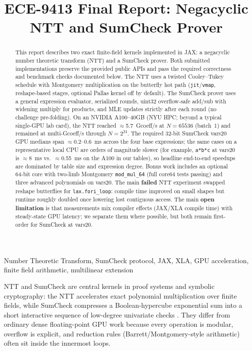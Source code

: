 \documentclass[conference]{IEEEtran}
\title{ECE-9413 Final Report: Negacyclic NTT and SumCheck Prover}
\author{\IEEEauthorblockN{Koshiq Hossain (kh3134)\qquad Jack Chou (cc9171)}
\IEEEauthorblockA{New York University\\
ECE-9413}}
\begin{document}
\maketitle

\begin{abstract}
This report describes two exact finite-field kernels implemented in JAX: a
negacyclic number theoretic transform (NTT) and a SumCheck prover. Both
submitted implementations preserve the provided public APIs and pass the
required correctness and benchmark checks documented below. The NTT uses a
twisted Cooley--Tukey schedule with Montgomery multiplication on the butterfly
hot path (\texttt{jit}/\texttt{vmap}, reshape-based stages, optional Pallas
kernel off by default). The SumCheck prover uses a general expression
evaluator, serialized rounds, uint32 overflow-safe add/sub with widening
multiply for products, and MLE updates strictly after each round (no
challenge pre-folding). On an NVIDIA A100--40GB (NYU HPC; beyond a typical
single-GPU lab card), the NTT reached $\approx$5.7~Gcoeff/s at $N{=}65536$
(batch~1) and remained at multi-Gcoeff/s through $N{=}2^{24}$. The required
32-bit SumCheck vars20 GPU medians span $\approx$0.2--0.6~ms across the four
base expressions; the same cases on a representative local CPU are orders of
magnitude slower (for example, \texttt{a*b*c} at vars20 is $\approx$8~ms vs.\
$\approx$0.55~ms on the A100 in our tables), so headline end-to-end speedups
are dominated by table size and expression degree. Bonus work includes an
optional 64-bit core with two-limb Montgomery \texttt{mod\_mul\_64} (full
core64 tests passing) and three advanced polynomials on vars20. The main
\textbf{failed} NTT experiment swapped reshape butterflies for
\texttt{lax.fori\_loop}: compile time improved on small shapes but runtime
roughly doubled once lowering lost contiguous access. The main \textbf{open
limitation} is that measurements mix compiler effects (JAX/XLA compile time)
with steady-state GPU latency; we separate them where possible, but both remain
first-order for SumCheck at vars20.
\end{abstract}

\begin{IEEEkeywords}
Number Theoretic Transform, SumCheck protocol, JAX, XLA, GPU acceleration,
finite field arithmetic, multilinear extension
\end{IEEEkeywords}
NTT and SumCheck are central kernels in proof systems and symbolic
cryptography: the NTT accelerates exact polynomial multiplication over finite
fields, while SumCheck compresses a Boolean-hypercube exponential sum into a
short interactive sequence of low-degree univariate checks \cite{thaler2015}. They differ from
ordinary dense floating-point GPU work because every operation is modular,
overflow is explicit, and reduction rules (Barrett/Montgomery-style arithmetic)
often sit inside the innermost loops.
\end{document}
